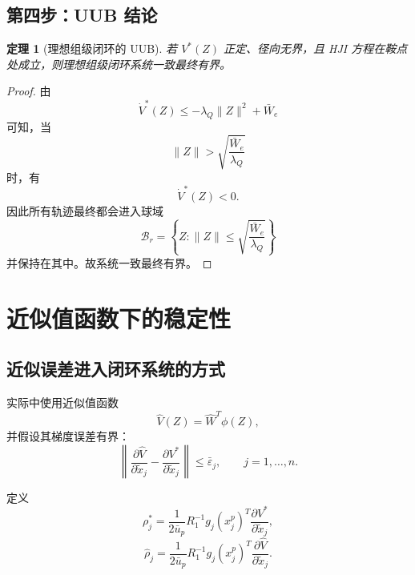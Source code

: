 \documentclass[12pt,a4paper]{ctexart}
\newtheorem{theorem}{定理}
\begin{document}
\subsection{第四步：UUB 结论}

\begin{theorem}[理想组级闭环的 UUB]
若 $V^*(Z)$ 正定、径向无界，且 HJI 方程在鞍点处成立，则理想组级闭环系统一致最终有界。
\end{theorem}

\begin{proof}
由
\begin{equation}
\dot V^*(Z)\le -\lambda_Q\|Z\|^2+\bar W_e
\end{equation}
可知，当
\begin{equation}
\|Z\| > \sqrt{\frac{\bar W_e}{\lambda_Q}}
\end{equation}
时，有
\begin{equation}
\dot V^*(Z)<0.
\end{equation}
因此所有轨迹最终都会进入球域
\begin{equation}
\mathcal B_r=\left\{Z:\|Z\|\le \sqrt{\frac{\bar W_e}{\lambda_Q}}\right\}
\end{equation}
并保持在其中。故系统一致最终有界。
\end{proof}

\section{近似值函数下的稳定性}

\subsection{近似误差进入闭环系统的方式}

实际中使用近似值函数
\begin{equation}
\hat V(Z)=\hat W^T\phi(Z),
\end{equation}
并假设其梯度误差有界：
\begin{equation}
\left\|
\frac{\partial \hat V}{\partial \tilde x_j}
-
\frac{\partial V^*}{\partial \tilde x_j}
\right\|
\le \bar\varepsilon_j,\qquad j=1,\dots,n.
\end{equation}

定义
\begin{equation}
\rho_j^*
=
\frac{1}{2\bar u_p}
R_1^{-1}g_j(x_j^p)^T\frac{\partial V^*}{\partial \tilde x_j},
\end{equation}
\begin{equation}
\hat\rho_j
=
\frac{1}{2\bar u_p}
R_1^{-1}g_j(x_j^p)^T\frac{\partial \hat V}{\partial \tilde x_j}.
\end{equation}
\end{document}
